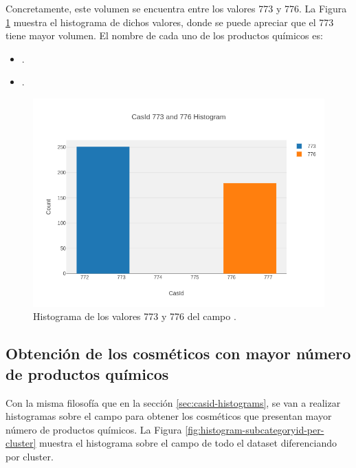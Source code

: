 Concretamente, este volumen se encuentra entre los valores 773 y 776. La Figura \ref{fig:histogram-casid-773-776} muestra el histograma de dichos valores, donde se puede apreciar que el  773 tiene mayor volumen. El nombre de cada uno de los productos químicos es:

\begin{itemize}
 \item {}.
 \item {}.
\end{itemize}

\begin{figure}[!th]
\includegraphics[scale=0.49]{figures/histogram-casid-773-776}
\centering
\caption{Histograma de los valores 773 y 776 del campo .}
\label{fig:histogram-casid-773-776}
\end{figure}








\newpage
\subsection{Obtención de los cosméticos con mayor número de productos químicos}
\label{sec:subcategoryid-histograms}

Con la misma filosofía que en la sección \ref{sec:casid-histograms}, se van a realizar histogramas sobre el campo  para obtener los cosméticos que presentan mayor número de productos químicos. La Figura \ref{fig:histogram-subcategoryid-per-cluster} muestra el histograma sobre el campo  de todo el dataset diferenciando por cluster.

